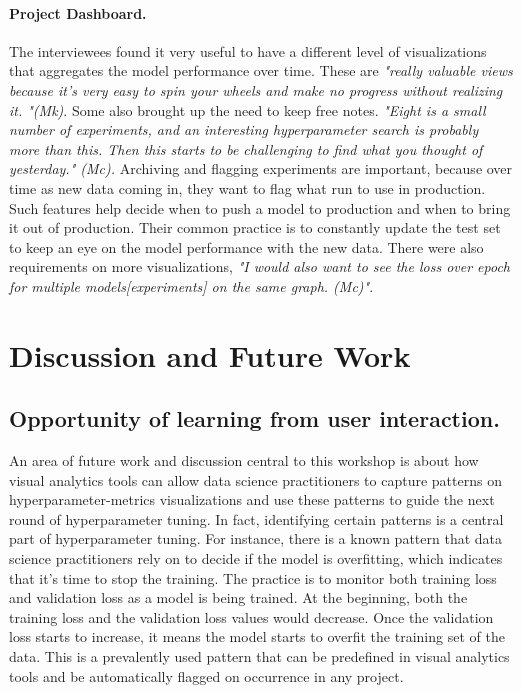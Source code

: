\documentclass[preprint]{vgtc}        %
\begin{document}
\paragraph{Project Dashboard.} 
The interviewees found it very useful to have a different level of visualizations that aggregates the model performance over time. These are \textit{"really valuable views because it's very easy to spin your wheels and make no progress without realizing it. "(Mk)}. Some also brought up the need to keep free notes. \textit{"Eight is a small number of experiments, and an interesting hyperparameter search is probably more than this. Then this starts to be challenging to find what you thought of yesterday." (Mc).} Archiving and flagging experiments are important, because over time as new data coming in, they want to flag what run to use in production. Such features help decide when to push a model to production and when to bring it out of production. Their common practice is to constantly update the test set to keep an eye on the model performance with the new data. There were also requirements on more visualizations, \textit{"I would also want to see the loss over epoch for multiple models[experiments] on the same graph. (Mc)"}.

\section{Discussion and Future Work}
\subsection{Opportunity of learning from user interaction.}
An area of future work and discussion central to this workshop is about how visual analytics tools can allow data science practitioners to capture patterns on hyperparameter-metrics visualizations and use these patterns to guide the next round of hyperparameter tuning. In fact, identifying certain patterns is a central part of hyperparameter tuning. For instance, there is a known pattern that data science practitioners rely on to decide if the model is overfitting, which indicates that it's time to stop the training. The practice is to monitor both training loss and validation loss as a model is being trained. At the beginning, both the training loss and the validation loss values would decrease. Once the validation loss starts to increase, it means the model starts to overfit the training set of the data. This is a prevalently used pattern that can be predefined in visual analytics tools and be automatically flagged on occurrence in any project.
\end{document}
